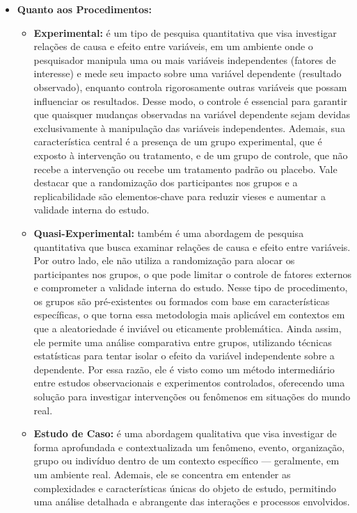 \begin{itemize}[itemsep=0pt, leftmargin=2.3cm]
    \item \textbf{Quanto aos Procedimentos:}
        \begin{itemize}[itemsep=0pt]
            \item \textbf{Experimental:} é um tipo de pesquisa quantitativa que visa investigar relações de causa e efeito entre variáveis, em um ambiente onde o pesquisador manipula uma ou mais variáveis independentes (fatores de interesse) e mede seu impacto sobre uma variável dependente (resultado observado), enquanto controla rigorosamente outras variáveis que possam influenciar os resultados. Desse modo, o controle é essencial para garantir que quaisquer mudanças observadas na variável dependente sejam devidas exclusivamente à manipulação das variáveis independentes. Ademais, sua característica central é a presença de um grupo experimental, que é exposto à intervenção ou tratamento, e de um grupo de controle, que não recebe a intervenção ou recebe um tratamento padrão ou placebo. Vale destacar que a randomização dos participantes nos grupos e a replicabilidade são elementos-chave para reduzir vieses e aumentar a validade interna do estudo.
            \item \textbf{Quasi-Experimental:} também é uma abordagem de pesquisa quantitativa que busca examinar relações de causa e efeito entre variáveis. Por outro lado, ele não utiliza a randomização para alocar os participantes nos grupos, o que pode limitar o controle de fatores externos e comprometer a validade interna do estudo. Nesse tipo de procedimento, os grupos são pré-existentes ou formados com base em características específicas, o que torna essa metodologia mais aplicável em contextos em que a aleatoriedade é inviável ou eticamente problemática. Ainda assim, ele permite uma análise comparativa entre grupos, utilizando técnicas estatísticas para tentar isolar o efeito da variável independente sobre a dependente. Por essa razão, ele é visto como um método intermediário entre estudos observacionais e experimentos controlados, oferecendo uma solução para investigar intervenções ou fenômenos em situações do mundo real.
            \item \textbf{Estudo de Caso:} é uma abordagem qualitativa que visa investigar de forma aprofundada e contextualizada um fenômeno, evento, organização, grupo ou indivíduo dentro de um contexto específico --- geralmente, em um ambiente real. Ademais, ele se concentra em entender as complexidades e características únicas do objeto de estudo, permitindo uma análise detalhada e abrangente das interações e processos envolvidos.

\end{itemize}
\end{itemize}

